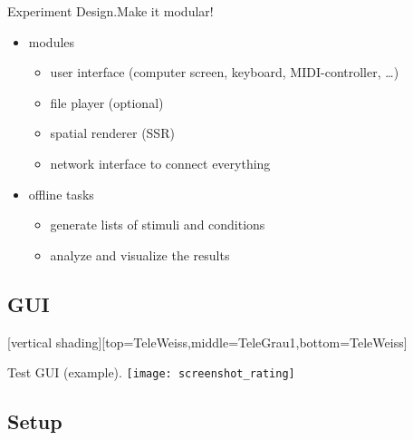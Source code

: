\documentclass{beamer}
\begin{document}
\begin{frame}{Experiment Design.}{Make it modular!}
\begin{itemize}
\item modules
\begin{itemize}
\item user interface (computer screen, keyboard, MIDI-controller, \dots)
\item file player (optional)
\item spatial renderer (SSR)
\item network interface to connect everything
\end{itemize}
\end{itemize}

\begin{itemize}
\item offline tasks
\begin{itemize}
\item generate lists of stimuli and conditions
\item analyze and visualize the results
\end{itemize}
\end{itemize}
\end{frame}

\subsection{GUI}

{
[vertical shading][top=TeleWeiss,middle=TeleGrau1,bottom=TeleWeiss]
\author{}\title{}

\begin{frame}{Test GUI (example).}
\vspace{\logomargin}
\noleftmargin\hspace{\logomargin}\texttt{[image: screenshot\_rating]}
\end{frame}
}

\subsection{Setup}
\end{document}
